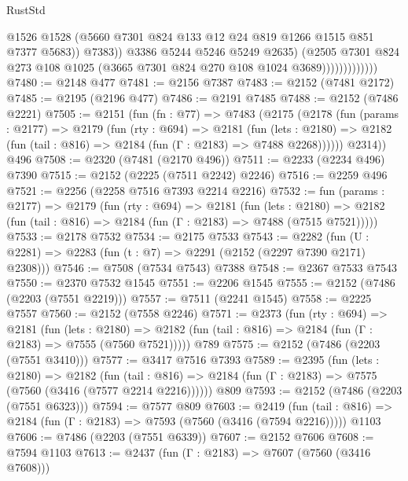 \begin{lexlean}{RustStd}
\begin{coremodule}
                                  @1526
                                  @1528
                                  (@5660 @7301 @824 @133 @12 @24 @819 @1266 @1515 @851 @7377 @5683))
                                @7383))
                            @3386
                            @5244
                            @5246
                            @5249
                            @2635)
                          (@2505
                            @7301
                            @824
                            @273
                            @108
                            @1025
                            (@3665 @7301 @824 @270 @108 @1024 @3689)))))))))))))
@7480 := @2148 @477
@7481 := @2156 @7387
@7483 := @2152 (@7481 @2172)
@7485 := @2195 (@2196 @477)
@7486 := @2191 @7485
@7488 := @2152 (@7486 @2221)
@7505 := @2151
    (fun (fn : @77) =>
    @7483
      (@2175
        (@2178
          (fun (params : @2177) =>
          @2179
            (fun (rty : @694) =>
            @2181
              (fun (lets : @2180) =>
              @2182 (fun (tail : @816) => @2184 (fun (Γ : @2183) => @7488 @2268))))))
        @2314))
    @496
@7508 := @2320 (@7481 (@2170 @496))
@7511 := @2233 (@2234 @496) @7390
@7515 := @2152 (@2225 (@7511 @2242) @2246)
@7516 := @2259 @496
@7521 := @2256 (@2258 @7516 @7393 @2214 @2216)
@7532 := fun (params : @2177) =>
  @2179
    (fun (rty : @694) =>
    @2181
      (fun (lets : @2180) =>
      @2182 (fun (tail : @816) => @2184 (fun (Γ : @2183) => @7488 (@7515 @7521)))))
@7533 := @2178 @7532
@7534 := @2175 @7533
@7543 := @2282 (fun (U : @2281) => @2283 (fun (t : @7) => @2291 (@2152 (@2297 @7390 @2171) @2308)))
@7546 := @7508 (@7534 @7543) @7388
@7548 := @2367 @7533 @7543
@7550 := @2370 @7532 @1545
@7551 := @2206 @1545
@7555 := @2152 (@7486 (@2203 (@7551 @2219)))
@7557 := @7511 (@2241 @1545)
@7558 := @2225 @7557
@7560 := @2152 (@7558 @2246)
@7571 := @2373
    (fun (rty : @694) =>
    @2181
      (fun (lets : @2180) =>
      @2182 (fun (tail : @816) => @2184 (fun (Γ : @2183) => @7555 (@7560 @7521)))))
    @789
@7575 := @2152 (@7486 (@2203 (@7551 @3410)))
@7577 := @3417 @7516 @7393
@7589 := @2395
    (fun (lets : @2180) =>
    @2182
      (fun (tail : @816) => @2184 (fun (Γ : @2183) => @7575 (@7560 (@3416 (@7577 @2214 @2216))))))
    @809
@7593 := @2152 (@7486 (@2203 (@7551 @6323)))
@7594 := @7577 @809
@7603 := @2419
    (fun (tail : @816) => @2184 (fun (Γ : @2183) => @7593 (@7560 (@3416 (@7594 @2216)))))
    @1103
@7606 := @7486 (@2203 (@7551 @6339))
@7607 := @2152 @7606
@7608 := @7594 @1103
@7613 := @2437 (fun (Γ : @2183) => @7607 (@7560 (@3416 @7608)))

\end{coremodule}
\end{lexlean}
